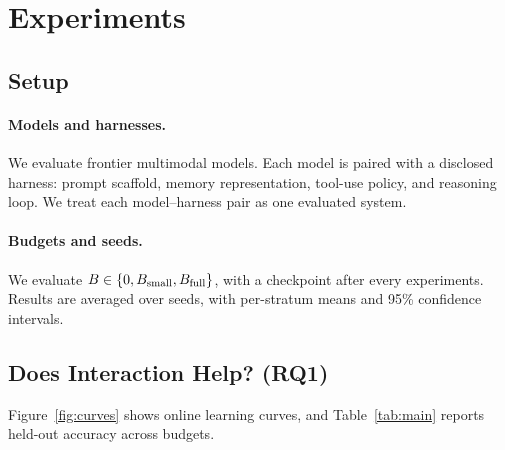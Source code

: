 \section{Experiments}
\label{sec:experiments}


\subsection{Setup}

\paragraph{Models and harnesses.} We evaluate  frontier multimodal models. Each model is paired with a disclosed harness: prompt scaffold, memory representation, tool-use policy, and reasoning loop. We treat each model--harness pair as one evaluated system. 

\paragraph{Budgets and seeds.} We evaluate $B \in \{0,B_{\rm small},B_{\rm full}\}$, with a checkpoint after every  experiments.  Results are averaged over  seeds, with per-stratum means and 95\% confidence intervals.

\subsection{Does Interaction Help? (RQ1)}

Figure~\ref{fig:curves} shows online learning curves, and Table~\ref{tab:main} reports held-out accuracy across budgets. 


